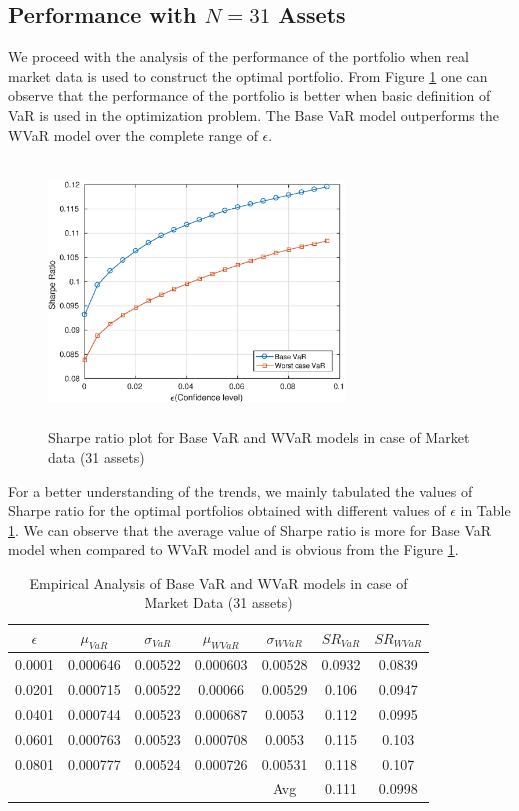 \subsection{Performance with $N=31$ Assets}
We proceed with the analysis of the performance of the portfolio when real market data is used to construct the optimal portfolio. From Figure \ref{fig:5.1} one can observe that the performance of the portfolio is better when basic definition of VaR is used in the optimization problem. The Base VaR model outperforms the WVaR model over the complete range of $\epsilon$.
\begin{figure}[!h]
\centering
\includegraphics[height=7.0cm,width=0.7\textwidth]{VaR/bse30_market/sr_cheb.eps}
\caption{Sharpe ratio plot for Base VaR and WVaR models in case of Market data (31 assets)}
\label{fig:5.1}
\end{figure}
For a better understanding of the trends, we mainly tabulated the values of Sharpe ratio for the optimal portfolios obtained with different values of $\epsilon$ in Table \ref{tab:5.1}. We can observe that the average value of Sharpe ratio is more for Base VaR model when compared to WVaR model and is obvious from the Figure \ref{fig:5.1}.

\begin{table}[!h]
\centering
\captionsetup{justification=centering}
\begin{tabular}{||c|c|c|c|c|c|c||}
\hline
$\epsilon$ & $\mu_{VaR}$ & $\sigma_{VaR}$ & $\mu_{WVaR}$ & $\sigma_{WVaR}$ & $SR_{VaR}$ & $SR_{WVaR}$\\
\hline
0.0001 & 0.000646 & 0.00522 & 0.000603 & 0.00528 & 0.0932 & 0.0839 \\
0.0201 & 0.000715 & 0.00522 & 0.00066 & 0.00529 & 0.106 & 0.0947 \\
0.0401 & 0.000744 & 0.00523 & 0.000687 & 0.0053 & 0.112 & 0.0995 \\
0.0601 & 0.000763 & 0.00523 & 0.000708 & 0.0053 & 0.115 & 0.103 \\
0.0801 & 0.000777 &0.00524 & 0.000726 & 0.00531 & 0.118 & 0.107 \\
\hline
& & & & Avg & 0.111	& 0.0998 \\
\hline
\end{tabular}
\caption{Empirical Analysis of Base VaR and WVaR models in case of Market Data (31 assets)}
\label{tab:5.1}
\end{table}

